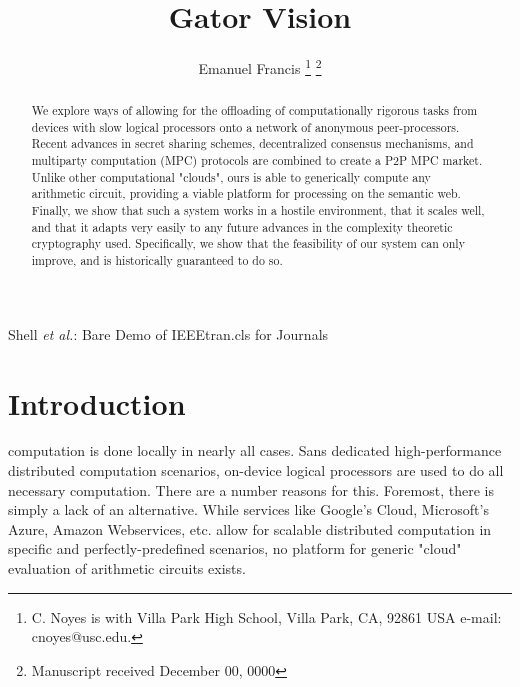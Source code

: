 \documentclass[journal]{IEEEtran}
\begin{document}
\title{Gator Vision}

\author{{Emanuel Francis}%
\thanks{C. Noyes is with Villa Park High School, Villa Park,
CA, 92861 USA e-mail: cnoyes@usc.edu.}%
\thanks{Manuscript received December 00, 0000}}

%
{Shell \MakeLowercase{\textit{et al.}}: Bare Demo of IEEEtran.cls for Journals}




\maketitle

\begin{abstract}
We explore ways of allowing for the offloading of computationally rigorous tasks from devices with slow logical processors onto a network of anonymous peer-processors. Recent advances in secret sharing schemes, decentralized consensus mechanisms, and multiparty computation (MPC) protocols are combined to create a P2P MPC market. Unlike other computational "clouds", ours is able to generically compute any arithmetic circuit, providing a viable platform for processing on the semantic web. Finally, we show that such a system works in a hostile environment, that it scales well, and that it adapts very easily to any future advances in the complexity theoretic cryptography used. Specifically, we show that the feasibility of our system can only improve, and is historically guaranteed to do so.
\end{abstract}


\IEEEpeerreviewmaketitle

\section{Introduction}
 computation is done locally in nearly all cases. Sans dedicated high-performance distributed computation scenarios, on-device logical processors are used to do all necessary computation. There are a number reasons for this. Foremost, there is simply a lack of an alternative. While services like Google's Cloud, Microsoft's Azure, Amazon Webservices, etc. allow for scalable distributed computation in specific and perfectly-predefined scenarios, no platform for generic "cloud" evaluation of arithmetic circuits exists.
\end{document}
